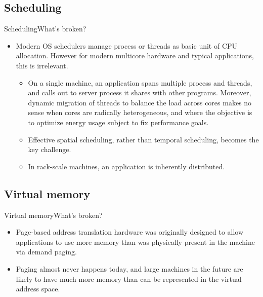 \documentclass[10pt]{beamer}
\begin{document}
\subsection{Scheduling}
\begin{frame}{Scheduling}{What's broken?}
  \begin{itemize}
    \item Modern OS schedulers manage process or threads as basic unit of CPU
          allocation. However for modern multicore hardware and typical
          applications, this is irrelevant.
    \begin{itemize}
      \item On a single machine, an application spans multiple process and
            threads, and calls out to server process it shares with other
            programs. Moreover, dynamic migration of threads to balance the
            load across cores makes no sense when cores are radically
            heterogeneous, and where the objective is to optimize energy usage
            subject to fix performance goals.
      \item Effective spatial scheduling, rather than temporal scheduling,
            becomes the key challenge.
      \item In rack-scale machines, an application is inherently distributed.
    \end{itemize}
  \end{itemize}
\end{frame}

\subsection{Virtual memory}
\begin{frame}{Virtual memory}{What's broken?}
  \begin{itemize}
    \item Page-based address translation hardware was originally designed to
          allow applications to use more memory than was physically present in
          the machine via demand paging.
    \item Paging almost never happens today, and large machines in the future
          are likely to have much more memory than can be represented in the
          virtual address space.
  \end{itemize}
\end{frame}
\end{document}
